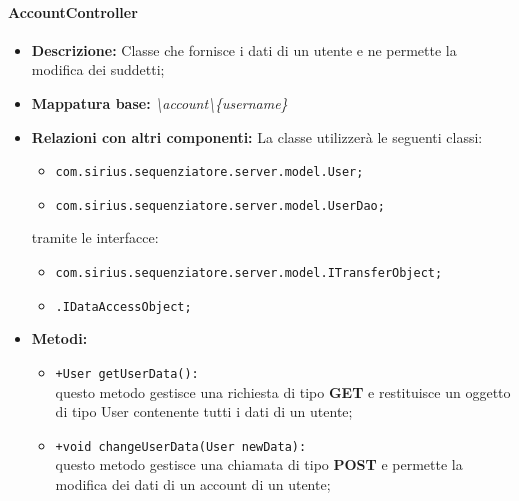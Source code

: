 \paragraph{AccountController}%
\begin{itemize}
	\item \textbf{Descrizione: } Classe che fornisce i dati di un utente e ne permette la modifica dei suddetti;
	\item \textbf{Mappatura base: } \textit{\textbackslash account\textbackslash \{username\}}
	\item \textbf{Relazioni con altri componenti: }
	La classe utilizzerà le seguenti classi:
	\begin{itemize}
		\item \texttt{com.sirius.sequenziatore.server.model.User;}
		\item \texttt{com.sirius.sequenziatore.server.model.UserDao;}
	\end{itemize}
	tramite le interfacce:
	\begin{itemize}
		\item \texttt{com.sirius.sequenziatore.server.model.ITransferObject;}
		\item \texttt{\sModel .IDataAccessObject;}
	\end{itemize}
	\item \textbf{Metodi: }\begin{itemize}
					\item \texttt{+User getUserData():}\\
					questo metodo gestisce una richiesta di tipo \textbf{GET} e restituisce un oggetto di tipo User contenente tutti i dati di un utente;
					\item \texttt{+void changeUserData(User newData):}\\
					questo metodo gestisce una chiamata di tipo \textbf{POST} e permette la modifica dei dati di un account di un utente;
				\end{itemize}
\end{itemize}
